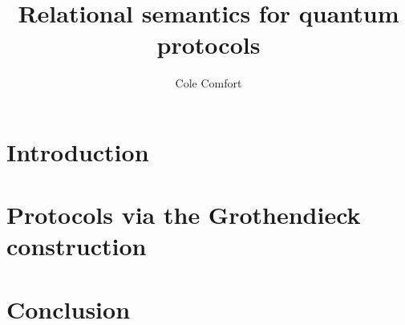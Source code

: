 \documentclass[12pt]{ociamthesis}  %
\title{Relational semantics for quantum protocols}
\author{Cole Comfort}
\begin{document}
\maketitle

\tableofcontents


\chapter{Introduction}

%
%
%
%
%
%
%

\chapter{Protocols via the Grothendieck construction}


\chapter{Conclusion}


 

\end{document}
